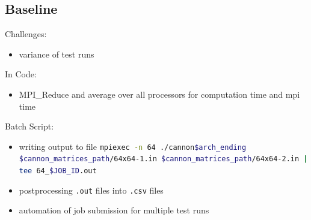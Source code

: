 \documentclass[9pt,pdftex]{beamer}
\begin{document}
\subsection{Baseline}
\begin{frame}{\insertsubsection}
\begin{block}{Challenges:}
\begin{itemize}
	\item variance of test runs
\end{itemize}
\end{block}

\begin{block}{In Code:}
\begin{itemize}
\item MPI{\_}Reduce and average over all processors for computation time and mpi time
\end{itemize}
\end{block}

\begin{block}{Batch Script:}
\begin{itemize}
	\item writing output to file
		\lstinline[language=bash]{mpiexec -n 64 ./cannon$arch_ending $cannon_matrices_path/64x64-1.in $cannon_matrices_path/64x64-2.in | tee 64_$JOB_ID.out}
	\item postprocessing \lstinline{.out} files into \lstinline{.csv} files
	\item automation of job submission for multiple test runs	
\end{itemize}
\end{block}

\end{frame}
\end{document}
